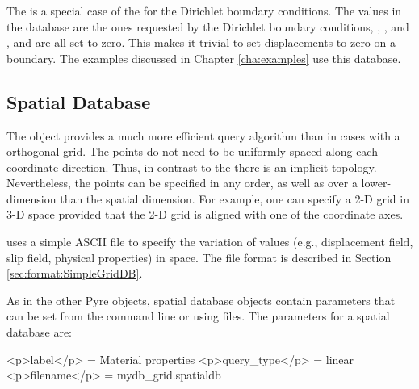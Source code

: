 \subsubsection{}

The  is a special case of the  for the Dirichlet
boundary conditions. The values in the database are the ones requested
by the Dirichlet boundary conditions, , ,
and , and are all set to zero. This makes it
trivial to set displacements to zero on a boundary. The examples discussed
in Chapter \vref{cha:examples} use this database.


\subsection{ Spatial Database}

The  object provides a much more efficient query
algorithm than  in cases with a orthogonal grid. The
points do not need to be uniformly spaced along each coordinate
direction. Thus, in contrast to the  there is an
implicit topology. Nevertheless, the points can be specified in any
order, as well as over a lower-dimension than the spatial dimension.
For example, one can specify a 2-D grid in 3-D space provided that the
2-D grid is aligned with one of the coordinate axes.

 uses a simple ASCII file to specify the variation of
values (e.g., displacement field, slip field, physical properties) in
space. The file format is described in Section
\vref{sec:format:SimpleGridDB}.

As in the other Pyre objects, spatial database objects contain parameters
that can be set from the command line or using 
files. The parameters for a spatial database are:
\begin{inventory}
\end{inventory}

\begin{cfg}
<p>label</p> = Material properties
<p>query_type</p> = linear
<p>filename</p> = mydb_grid.spatialdb
\end{cfg}

